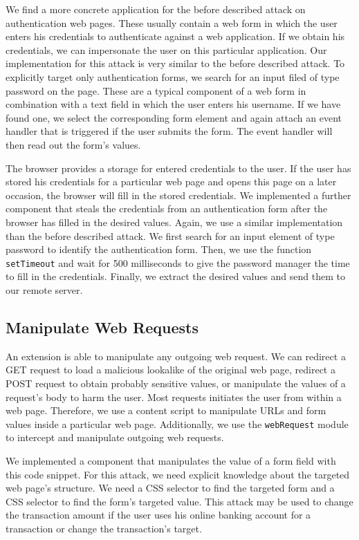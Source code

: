 	We find a more concrete application for the before described attack on authentication web pages. These usually contain a web form in which the user enters his credentials to authenticate against a web application. If we obtain his credentials, we can impersonate the user on this particular application. Our implementation for this attack is very similar to the before described attack. To explicitly target only authentication forms, we search for an input filed of type password on the page. These are a typical component of a web form in combination with a text field in which the user enters his username. If we have found one, we select the corresponding form element and again attach an event handler that is triggered if the user submits the form. The event handler will then read out the form's values.

	The browser provides a storage for entered credentials to the user. If the user has stored his credentials for a particular web page and opens this page on a later occasion, the browser will fill in the stored credentials. We implemented a further component that steals the credentials from an authentication form after the browser has filled in the desired values. Again, we use a similar implementation than the before described attack. We first search for an input element of type password to identify the authentication form. Then, we use the function \texttt{setTimeout} and wait for 500 milliseconds to give the password manager the time to fill in the credentials. Finally, we extract the desired values and send them to our remote server.
		
\subsection{Manipulate Web Requests}
\label{sec:manipulateWebRequests}

	An extension is able to manipulate any outgoing web request. We can redirect a GET request to load a malicious lookalike of the original web page, redirect a POST request to obtain probably sensitive values, or manipulate the values of a request's body to harm the user. Most requests initiates the user from within a web page. Therefore, we use a content script to manipulate URLs and form values inside a particular web page. Additionally, we use the \texttt{webRequest} module to intercept and manipulate outgoing web requests.
	
	We implemented a component that manipulates the value of a form field with this code snippet. For this attack, we need explicit knowledge about the targeted web page's structure. We need a CSS selector to find the targeted form and a CSS selector to find the form's targeted value. This attack may be used to change the transaction amount if the user uses his online banking account for a transaction or change the transaction's target. 

